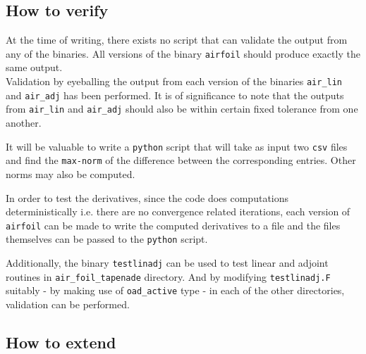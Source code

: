 \subsection{How to verify}
At the time of writing, there exists no script that can validate the output from any of the binaries. All versions of the binary \texttt{airfoil} should produce exactly the same output.\\

\noindent Validation by eyeballing the output from each version of the binaries \texttt{air\_lin} and  \texttt{air\_adj} has been performed. It is of significance to note that the outputs from \texttt{air\_lin} and  \texttt{air\_adj} should also be within certain fixed tolerance from one another.

\begin{TodoPar}
\noindent It will be valuable to write a \texttt{python} script that will take as input two \texttt{csv} files and find the \texttt{max-norm} of the difference between the corresponding entries. Other norms may also be computed. 
\end{TodoPar}

\noindent In order to test the derivatives, since the code does computations deterministically i.e. there are no convergence related iterations, each version of \texttt{airfoil} can be made to write the computed derivatives to a file and the files themselves can be passed to the \texttt{python} script.\\

\begin{TodoPar}
\noindent Additionally, the binary \texttt{testlinadj} can be used to test linear and adjoint routines in \texttt{air\_foil\_tapenade} directory. And by modifying \texttt{testlinadj.F} suitably - by making use of \texttt{oad\_active} type - in each of the other directories, validation can be performed.
\end{TodoPar}


\subsection{How to extend}
